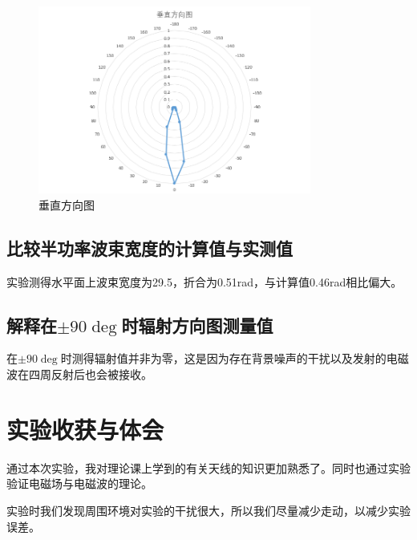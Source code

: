 \documentclass{../source/Experiment}
\begin{document}
        \begin{figure}[H]
            \centering
            \includegraphics[width = 0.8\textwidth]{pic/垂直.png}
            \caption{垂直方向图}
        \end{figure}


        \subsection{比较半功率波束宽度的计算值与实测值}
        实验测得水平面上波束宽度为29.5\degree ，折合为0.51rad，与计算值0.46rad相比偏大。
        \subsection{ 解释在$\pm 90 \deg$时辐射方向图测量值}
        在$\pm 90 \deg$时测得辐射值并非为零，这是因为存在背景噪声的干扰以及发射的电磁波在四周反射后也会被接收。

    \section{实验收获与体会}
        通过本次实验，我对理论课上学到的有关天线的知识更加熟悉了。同时也通过实验验证电磁场与电磁波的理论。

        实验时我们发现周围环境对实验的干扰很大，所以我们尽量减少走动，以减少实验误差。
\end{document}
